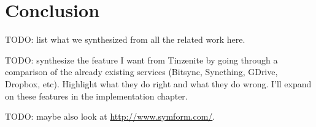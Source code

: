 \section{Conclusion}

TODO: list what we synthesized from all the related work here.

TODO: synthesize the feature I want from Tinzenite by going through a comparison of the already existing services (Bitsync, Syncthing, GDrive, Dropbox, etc).
Highlight what they do right and what they do wrong.
I'll expand on these features in the implementation chapter.

TODO: maybe also look at \url{http://www.symform.com/}.
